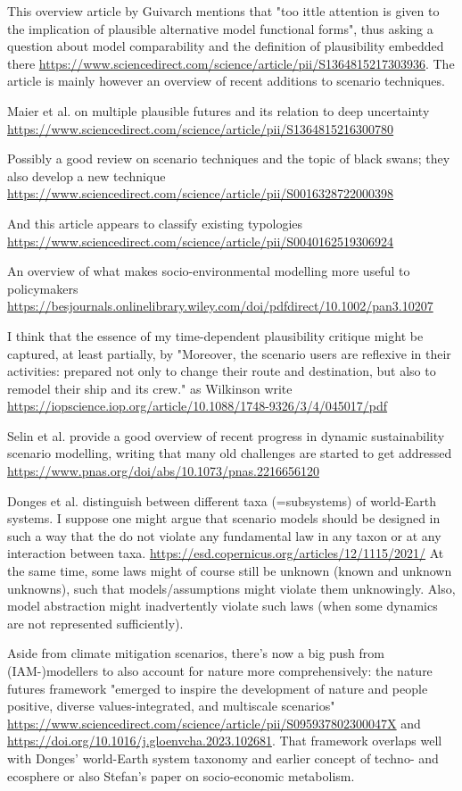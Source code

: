 \documentclass{article}
\begin{document}
This overview article by Guivarch mentions that "too ittle attention is given to the implication of plausible alternative model functional forms", thus asking a question about model comparability and the definition of plausibility embedded there \url{https://www.sciencedirect.com/science/article/pii/S1364815217303936}. The article is mainly however an overview of recent additions to scenario techniques.

Maier et al. on multiple plausible futures and its relation to deep uncertainty \url{https://www.sciencedirect.com/science/article/pii/S1364815216300780}

Possibly a good review on scenario techniques and the topic of black swans; they also develop a new technique \url{https://www.sciencedirect.com/science/article/pii/S0016328722000398}

And this article appears to classify existing typologies \url{https://www.sciencedirect.com/science/article/pii/S0040162519306924}

An overview of what makes socio-environmental modelling more useful to policymakers \url{https://besjournals.onlinelibrary.wiley.com/doi/pdfdirect/10.1002/pan3.10207}

I think that the essence of my time-dependent plausibility critique might be captured, at least partially, by "Moreover, the scenario users are reflexive in their activities: prepared not only to change their route and destination, but also to remodel their ship and its crew." as Wilkinson write \url{https://iopscience.iop.org/article/10.1088/1748-9326/3/4/045017/pdf}

Selin et al. provide a good overview of recent progress in dynamic sustainability scenario modelling, writing that many old challenges are started to get addressed \url{https://www.pnas.org/doi/abs/10.1073/pnas.2216656120}

Donges et al. distinguish between different taxa (=subsystems) of world-Earth systems. I suppose one might argue that scenario models should be designed in such a way that the do not violate any fundamental law in any taxon or at any interaction between taxa. \url{https://esd.copernicus.org/articles/12/1115/2021/} At the same time, some laws might of course still be unknown (known and unknown unknowns), such that models/assumptions might violate them unknowingly. Also, model abstraction might inadvertently violate such laws (when some dynamics are not represented sufficiently).

Aside from climate mitigation scenarios, there's now a big push from (IAM-)modellers to also account for nature more comprehensively: the nature futures framework "emerged to inspire the development of nature and people positive, diverse values-integrated, and multiscale scenarios" \url{https://www.sciencedirect.com/science/article/pii/S095937802300047X} and \url{https://doi.org/10.1016/j.gloenvcha.2023.102681}. That framework overlaps well with Donges' world-Earth system taxonomy and earlier concept of techno- and ecosphere or also Stefan's paper on socio-economic metabolism.
\end{document}

